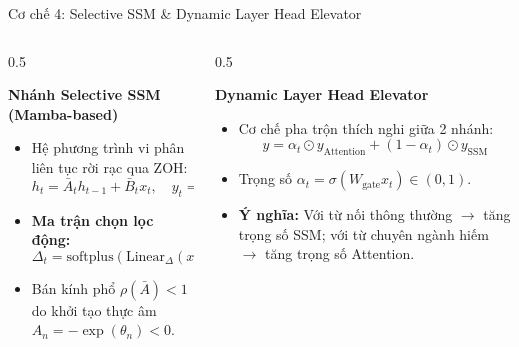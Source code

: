 \documentclass[aspectratio=169, 10pt]{beamer}
\begin{document}
\begin{frame}{Cơ chế 4: Selective SSM \& Dynamic Layer Head Elevator}
  \begin{columns}
    \begin{column}{0.5\textwidth}
      \begin{block}{\textbf{Nhánh Selective SSM (Mamba-based)}}
        \begin{itemize}
          \item Hệ phương trình vi phân liên tục rời rạc qua ZOH:
            $$h_t = \bar{A}_t h_{t-1} + \bar{B}_t x_t, \quad y_t = C_t h_t$$
          \item \textbf{Ma trận chọn lọc động:}
            $$\Delta_t = \text{softplus}(\text{Linear}_\Delta(x_t))$$
          \item Bán kính phổ $\rho(\bar{A}) < 1$ do khởi tạo thực âm $A_n = -\exp(\theta_n) < 0$.
        \end{itemize}
      \end{block}
    \end{column}
    \begin{column}{0.5\textwidth}
      \begin{block}{\textbf{Dynamic Layer Head Elevator}}
        \begin{itemize}
          \item Cơ chế pha trộn thích nghi giữa 2 nhánh:
            $$y = \alpha_t \odot y_{\text{Attention}} + (1 - \alpha_t) \odot y_{\text{SSM}}$$
          \item Trọng số $\alpha_t = \sigma(W_{\text{gate}} x_t) \in (0, 1)$.
          \item \textbf{Ý nghĩa:} Với từ nối thông thường $\to$ tăng trọng số SSM; với từ chuyên ngành hiếm $\to$ tăng trọng số Attention.
        \end{itemize}
      \end{block}
    \end{column}
  \end{columns}
\end{frame}
\end{document}
